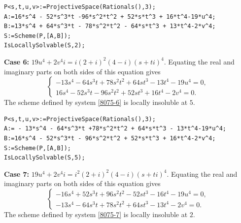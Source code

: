 \documentclass[a4paper,12pt,english,reqno]{amsart}
\begin{document}

\begin{lstlisting}
P<s,t,u,v>:=ProjectiveSpace(Rationals(),3);
A:=16*s^4 - 52*s^3*t -96*s^2*t^2 + 52*s*t^3 + 16*t^4-19*u^4;
B:=13*s^4 + 64*s^3*t - 78*s^2*t^2 - 64*s*t^3 + 13*t^4-2*v^4;
S:=Scheme(P,[A,B]);
IsLocallySolvable(S,2);
\end{lstlisting}

{\bf Case 6:} $19u^4+2v^4i=i(2+i)^2(4-i)(s+ti)^4$.  Equating the real and imaginary parts on both sides of this equation gives
\begin{equation}\label{8075-6}
\begin{cases}
-13s^4 - 64s^3t + 78s^2t^2 + 64st^3 - 13t^4 - 19u^4=0,\\
16s^4 - 52s^3t - 96s^2t^2 + 52st^3 + 16t^4 - 2v^4=0.
\end{cases}
\end{equation}
The scheme defined by system \eqref{8075-6} is locally insoluble at $5$.

\begin{lstlisting}
P<s,t,u,v>:=ProjectiveSpace(Rationals(),3);
A:= - 13*s^4 - 64*s^3*t +78*s^2*t^2 + 64*s*t^3 - 13*t^4-19*u^4;
B:=16*s^4 - 52*s^3*t - 96*s^2*t^2 + 52*s*t^3 + 16*t^4-2*v^4;
S:=Scheme(P,[A,B]);
IsLocallySolvable(S,5);
\end{lstlisting}

{\bf Case 7:} $19u^4+2v^4i=i^2(2+i)^2(4-i)(s+ti)^4$.  Equating the real and imaginary parts on both sides of this equation gives
\begin{equation}\label{8075-7}
\begin{cases}
-16s^4 + 52s^3t + 96s^2t^2 - 52st^3 - 16t^4 - 19u^4=0,\\
-13s^4 - 64s^3t + 78s^2t^2 + 64st^3 - 13t^4 - 2v^4=0.
\end{cases}
\end{equation}
The scheme defined by system \eqref{8075-7} is locally insoluble at $2$.
\end{document}
